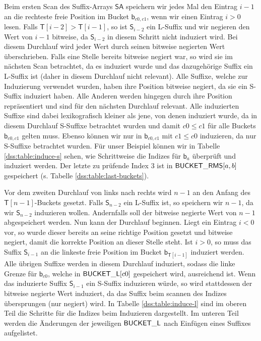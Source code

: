Beim ersten Scan des Suffix-Arrays $\mathsf{SA}$ speichern wir jedes Mal den Eintrag $i-1$ an die rechteste freie Position im Bucket $\mathsf{b}_{c0,c1}$, wenn wir einen Eintrag $i > 0$ lesen. Falls $\mathsf{T}[i-2] > \mathsf{T}[i-1]$, so ist $\mathsf{S}_{i-2}$ ein L-Suffix und wir negieren den Wert von $i-1$ bitweise, da $\mathsf{S}_{i-2}$ in diesem Schritt nicht induziert wird. Bei diesem Durchlauf wird jeder Wert durch seinen bitweise negierten Wert überschrieben. Falls eine Stelle bereits bitweise negiert war, so wird sie im nächsten Scan betrachtet, da es induziert wurde und das dazugehörige Suffix ein L-Suffix ist (daher in diesem Durchlauf nicht relevant). Alle Suffixe, welche zur Induzierung verwendet wurden, haben ihre Position bitweise negiert, da sie ein S-Suffix induziert haben. Alle Anderen werden hingegen durch ihre Position repräsentiert und sind für den nächsten Durchlauf relevant. Alle induzierten Suffixe sind dabei lexikografisch kleiner als jene, von denen induziert wurde, da in diesem Durchlauf S-Suffixe betrachtet wurden und damit $c0 \leq c1$ für alle Buckets $\mathsf{b}_{c0,c1}$ gelten muss. Ebenso können wir nur in $\mathsf{b}_{c0,c1}$ mit $c1 \leq c0$ induzieren, da nur S-Suffixe betrachtet wurden. Für unser Beispiel können wir in Tabelle \ref{dss:table:induce-s} sehen, wie Schrittweise die Indizes für $\mathsf{b}_{a}$ überprüft und induziert werden. Der letzte zu prüfende Index 3 ist in $\mathsf{BUCK\-ET\_RMS}[a,b]$ gespeichert (s. Tabelle \ref{dss:table:last-buckets}).

Vor dem zweiten Durchlauf von links nach rechts wird $n-1$ an den Anfang des $\mathsf{T}[n-1]$-Buckets gesetzt. Falls $\mathsf{S}_{n-2}$ ein L-Suffix ist, so speichern wir $n-1$, da wir $\mathsf{S}_{n-2}$ induzieren wollen. Andernfalls soll der bitweise negierte Wert von $n-1$ abgespeichert werden. Nun kann der Durchlauf beginnen.
Liegt ein Eintrag $i < 0$ vor, so wurde dieser bereits an seine richtige Position gesetzt und bitweise negiert, damit die korrekte Position an dieser Stelle steht. Ist $i > 0$, so muss das Suffix $\mathsf{S}_{i-1}$ an die linkeste freie Position im Bucket $\mathsf{b}_{\mathsf{T}[i-1]}$ induziert werden. Alle übrigen Suffixe werden in diesem Durchlauf induziert, sodass die linke Grenze für $\mathsf{b}_{c0}$, welche in $\mathsf{BUCK\-ET\_L}[c0]$ gespeichert wird, ausreichend ist. Wenn das induzierte Suffix $\mathsf{S}_{i-1}$ ein S-Suffix induzieren würde, so wird stattdessen der bitweise negierte Wert induziert, da das Suffix beim scannen des Indizes übersprungen (nur negiert) wird. In Tabelle \ref{dss:table:induce-l} sind im oberen Teil die Schritte für die Indizes beim Induzieren dargestellt. Im unteren Teil werden die Änderungen der jeweiligen $\mathsf{BUCK\-ET\_L}$ nach Einfügen eines Suffixes aufgelistet.
